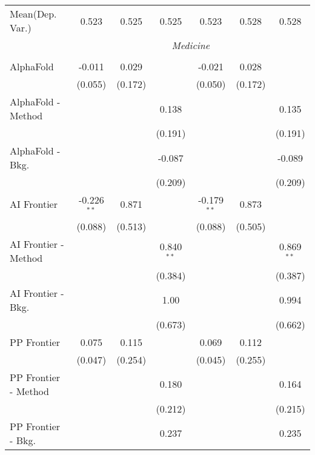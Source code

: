 \begin{tabular}{lcccccc}
Mean(Dep. Var.) & 0.523 & 0.525 & 0.525 & 0.523 & 0.528 & 0.528 \\
 & \multicolumn{6}{c}{\textit{Medicine}} \\ \\
   AlphaFold            & -0.011        & 0.029   &              & -0.021        & 0.028   &   \\   
                        & (0.055)       & (0.172) &              & (0.050)       & (0.172) &   \\   
   AlphaFold - Method   &               &         & 0.138        &               &         & 0.135\\   
                        &               &         & (0.191)      &               &         & (0.191)\\   
   AlphaFold - Bkg.     &               &         & -0.087       &               &         & -0.089\\   
                        &               &         & (0.209)      &               &         & (0.209)\\   
   AI Frontier          & -0.226$^{**}$ & 0.871   &              & -0.179$^{**}$ & 0.873   &   \\   
                        & (0.088)       & (0.513) &              & (0.088)       & (0.505) &   \\   
   AI Frontier - Method &               &         & 0.840$^{**}$ &               &         & 0.869$^{**}$\\   
                        &               &         & (0.384)      &               &         & (0.387)\\   
   AI Frontier - Bkg.   &               &         & 1.00         &               &         & 0.994\\   
                        &               &         & (0.673)      &               &         & (0.662)\\   
   PP Frontier          & 0.075         & 0.115   &              & 0.069         & 0.112   &   \\   
                        & (0.047)       & (0.254) &              & (0.045)       & (0.255) &   \\   
   PP Frontier - Method &               &         & 0.180        &               &         & 0.164\\   
                        &               &         & (0.212)      &               &         & (0.215)\\   
   PP Frontier - Bkg.   &               &         & 0.237        &               &         & 0.235\\   

\end{tabular}
